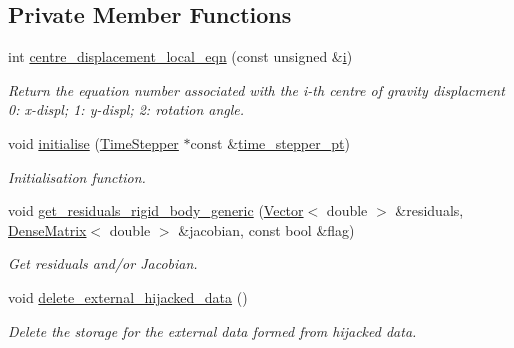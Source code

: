 \subsection*{Private Member Functions}
\begin{DoxyCompactItemize}
\item 
int \hyperlink{classoomph_1_1ImmersedRigidBodyElement_aae4212a06293e06c0d8ccf2ce57a466f}{centre\+\_\+displacement\+\_\+local\+\_\+eqn} (const unsigned \&\hyperlink{cfortran_8h_adb50e893b86b3e55e751a42eab3cba82}{i})
\begin{DoxyCompactList}\small\item\em Return the equation number associated with the i-\/th centre of gravity displacment 0\+: x-\/displ; 1\+: y-\/displ; 2\+: rotation angle. \end{DoxyCompactList}\item 
void \hyperlink{classoomph_1_1ImmersedRigidBodyElement_a34eec4f661aafa32f5d4cf14ceb1f850}{initialise} (\hyperlink{classoomph_1_1TimeStepper}{Time\+Stepper} $\ast$const \&\hyperlink{classoomph_1_1GeomObject_a3c92023891dd4a0e818022f467eeb7f1}{time\+\_\+stepper\+\_\+pt})
\begin{DoxyCompactList}\small\item\em Initialisation function. \end{DoxyCompactList}\item 
void \hyperlink{classoomph_1_1ImmersedRigidBodyElement_a7890b76d95e13de6436423a2989bf3ec}{get\+\_\+residuals\+\_\+rigid\+\_\+body\+\_\+generic} (\hyperlink{classoomph_1_1Vector}{Vector}$<$ double $>$ \&residuals, \hyperlink{classoomph_1_1DenseMatrix}{Dense\+Matrix}$<$ double $>$ \&jacobian, const bool \&flag)
\begin{DoxyCompactList}\small\item\em Get residuals and/or Jacobian. \end{DoxyCompactList}\item 
void \hyperlink{classoomph_1_1ImmersedRigidBodyElement_a5d9b6718a4d1b92c8849861224c11cc4}{delete\+\_\+external\+\_\+hijacked\+\_\+data} ()
\begin{DoxyCompactList}\small\item\em Delete the storage for the external data formed from hijacked data. \end{DoxyCompactList}\end{DoxyCompactItemize}
